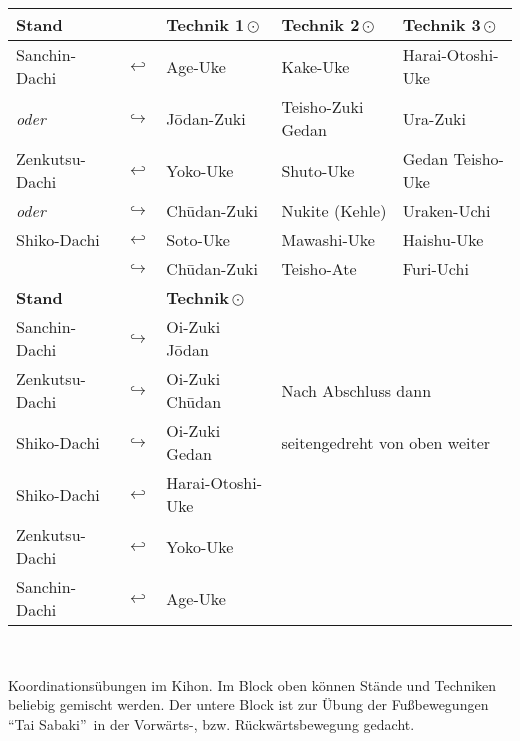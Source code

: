 	\setlength{\tabcolsep}{3pt}		
	\null\vfill\null
	\begin{tabularx}{\textwidth}{llXXX}
		\textbf{Stand} 		& & \textbf{Technik 1\,\(\odot\)} 	& \textbf{Technik 2\,\(\odot\)} 	& \textbf{Technik 3\,\(\odot\)}\\
		\midrule
		Sanchin-Dachi 		& \(\hookleftarrow\)	& Age-Uke				& Kake-Uke 				& Harai-Otoshi-Uke	\\
		\textit{oder}		& \(\hookrightarrow\) 	& J\={o}dan-Zuki 		& Teisho-Zuki Gedan		& Ura-Zuki			\\
		Zenkutsu-Dachi		& \(\hookleftarrow\)	& Yoko-Uke 				& Shuto-Uke 			& Gedan Teisho-Uke	\\
		\textit{oder}		& \(\hookrightarrow\)	& Ch\={u}dan-Zuki 		& Nukite (Kehle) 		& Uraken-Uchi		\\
		Shiko-Dachi			& \(\hookleftarrow\)	& Soto-Uke 				& Mawashi-Uke 			& Haishu-Uke		\\
		& \(\hookrightarrow\)	& Ch\={u}dan-Zuki	& Teisho-Ate 			& Furi-Uchi			\\
		\midrule
		\textbf{Stand} 		& & \textbf{Technik\,\(\odot\)} 		&  						&\\
		\midrule
		Sanchin-Dachi 		& \(\hookrightarrow\)	& Oi-Zuki J\={o}dan 	&  						&\\
		Zenkutsu-Dachi		& \(\hookrightarrow\)	& Oi-Zuki Ch\={u}dan 	&\multicolumn{2}{l}{Nach Abschluss dann}\\
		Shiko-Dachi			& \(\hookrightarrow\)	& Oi-Zuki Gedan 		&\multicolumn{2}{l}{seitengedreht von oben weiter}\\
		Shiko-Dachi			& \(\hookleftarrow\)	& Harai-Otoshi-Uke 		&  						&\\
		Zenkutsu-Dachi		& \(\hookleftarrow\)	& Yoko-Uke 				&  						&\\
		Sanchin-Dachi		& \(\hookleftarrow\)	& Age-Uke 				&  						&\\
	\end{tabularx}\\\null\vfill\null
	\setlength{\tabcolsep}{6pt}	
	\begin{center}
		\parbox{\textwidth-2\tabcolsep}{Koordinationsübungen im Kihon. Im Block oben können Stände und Techniken beliebig gemischt werden. Der untere Block ist zur Übung der Fußbewegungen \textquotedblleft Tai Sabaki\textquotedblright~in der Vorwärts-, bzw. Rückwärtsbewegung gedacht.}
	\end{center}\null\vfill\null